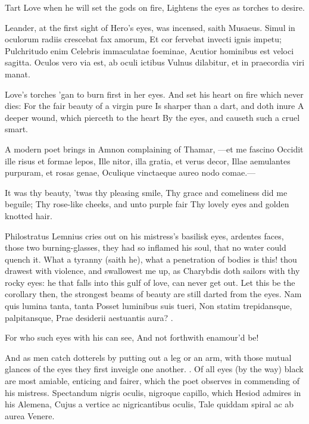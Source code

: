 {Tart Love when he will set the gods on fire,
Lightens the eyes as torches to desire.

Leander, at the first sight of Hero's eyes, was incensed, saith
Musaeus.
Simul in oculorum radiis crescebat fax amorum,
Et cor fervebat invecti ignis impetu;
Pulchritudo enim Celebris immaculatae foeminae,
Acutior hominibus est veloci sagitta.
Oculos vero via est, ab oculi ictibus
Vulnus dilabitur, et in praecordia viri manat.

Love's torches 'gan to burn first in her eyes.
And set his heart on fire which never dies:
For the fair beauty of a virgin pure
Is sharper than a dart, and doth inure
A deeper wound, which pierceth to the heart
By the eyes, and causeth such a cruel smart.

A modern poet brings in Amnon complaining of Thamar,
---et me fascino
Occidit ille risus et formae lepos,
Ille nitor, illa gratia, et verus decor,
Illae aemulantes purpuram, et rosas genae,
Oculique vinctaeque aureo nodo comae.---

It was thy beauty, 'twas thy pleasing smile,
Thy grace and comeliness did me beguile;
Thy rose-like cheeks, and unto purple fair
Thy lovely eyes and golden knotted hair.

Philostratus Lemnius cries out on his mistress's basilisk eyes,
ardentes faces, those two burning-glasses, they had so inflamed his
soul, that no water could quench it. What a tyranny (saith he), what a
penetration of bodies is this! thou drawest with violence, and
swallowest me up, as Charybdis doth sailors with thy rocky eyes: he
that falls into this gulf of love, can never get out. Let this be the
corollary then, the strongest beams of beauty are still darted from the
eyes.
Nam quis lumina tanta, tanta
Posset luminibus suis tueri,
Non statim trepidansque, palpitansque,
Prae desiderii aestuantis aura? \etc{}.

For who such eyes with his can see,
And not forthwith enamour'd be!

And as men catch dotterels by putting out a leg or an arm, with those
mutual glances of the eyes they first inveigle one another.
. Of all eyes (by the
way) black are most amiable, enticing and fairer, which the poet
observes in commending of his mistress. Spectandum nigris oculis,
nigroque capillo, which Hesiod admires in his Alemena,
Cujus a vertice ac nigricantibus oculis,
Tale quiddam spiral ac ab aurea Venere.

}
